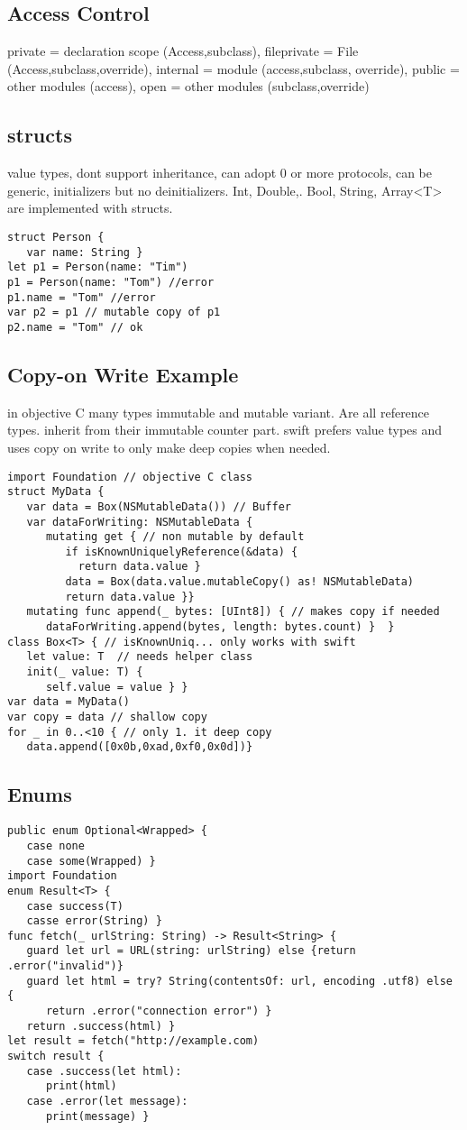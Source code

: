 \subsection{Access Control}
private = declaration scope (Access,subclass), fileprivate = File (Access,subclass,override), internal = module (access,subclass, override), public = other modules (access), open = other modules (subclass,override)

\subsection{structs}
value types, dont support inheritance, can adopt 0 or more protocols, can be generic, initializers but no deinitializers. Int, Double,. Bool, String, Array<T> are implemented with structs.
\begin{lstlisting}
struct Person {
   var name: String }
let p1 = Person(name: "Tim")
p1 = Person(name: "Tom") //error
p1.name = "Tom" //error
var p2 = p1 // mutable copy of p1
p2.name = "Tom" // ok
\end{lstlisting}

\subsection{Copy-on Write Example}
in objective C many types immutable and mutable variant. Are all reference types. inherit from their immutable counter part. swift prefers value types and uses copy on write to only make deep copies when needed.
\begin{lstlisting}
import Foundation // objective C class
struct MyData {
   var data = Box(NSMutableData()) // Buffer
   var dataForWriting: NSMutableData {
      mutating get { // non mutable by default
         if isKnownUniquelyReference(&data) {
           return data.value }
         data = Box(data.value.mutableCopy() as! NSMutableData)
         return data.value }}
   mutating func append(_ bytes: [UInt8]) { // makes copy if needed
      dataForWriting.append(bytes, length: bytes.count) }  }
class Box<T> { // isKnownUniq... only works with swift
   let value: T  // needs helper class
   init(_ value: T) {
      self.value = value } }
var data = MyData()
var copy = data // shallow copy
for _ in 0..<10 { // only 1. it deep copy
   data.append([0x0b,0xad,0xf0,0x0d])}
\end{lstlisting}

\subsection{Enums}
\begin{lstlisting}
public enum Optional<Wrapped> {
   case none
   case some(Wrapped) }
import Foundation
enum Result<T> {
   case success(T)
   casse error(String) }
func fetch(_ urlString: String) -> Result<String> {
   guard let url = URL(string: urlString) else {return .error("invalid")}
   guard let html = try? String(contentsOf: url, encoding .utf8) else {
      return .error("connection error") }
   return .success(html) }
let result = fetch("http://example.com)
switch result {
   case .success(let html):
      print(html)
   case .error(let message):
      print(message) }
\end{lstlisting}

